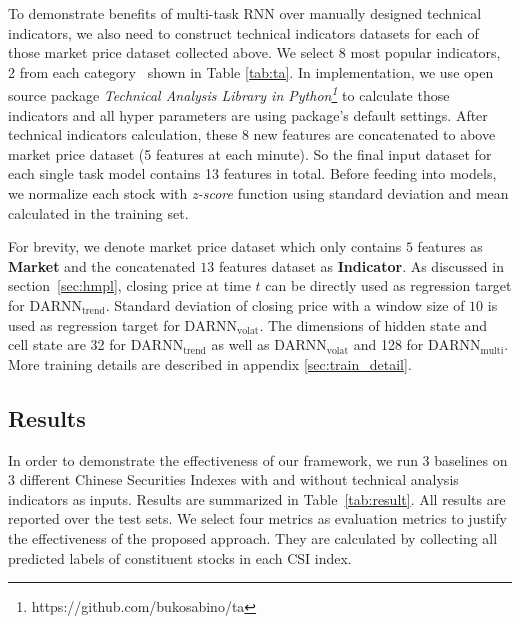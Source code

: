 \documentclass[sigconf]{acmart}
\renewcommand{\cite}{\citep}
\begin{document}
To demonstrate benefits of multi-task RNN over
manually designed technical indicators, we also need to construct
technical indicators datasets for each of those market price
dataset collected above. We select 8 most popular indicators, 2
from each category~\cite{kirkpatrick2010technical} shown in Table
\ref{tab:ta}. In implementation, we use open source package
\emph{Technical Analysis Library in
  Python\footnote{https://github.com/bukosabino/ta}} to calculate
those indicators and all hyper parameters are using package's
default settings. After technical indicators calculation, these 8
new features are concatenated to above market price dataset (5
features at each minute). So the final input dataset for each single
task model contains 13 features in total. Before feeding into
models, we normalize each stock with \emph{z-score}
function using standard deviation and mean calculated in the training set.

For brevity, we denote market price dataset which only contains  $5$ features as \textbf{Market} and the concatenated $13$ features dataset as
\textbf{Indicator}. As discussed in section~\ref{sec:hmpl}, 
closing price at time $t$ can be directly used as regression 
target for $\text{DARNN}_{\text{trend}}$. 
Standard deviation of closing price with a window size of $10$ 
is used as regression target for $\text{DARNN}_{\text{volat}}$.
The dimensions of
hidden state and cell state are 32 for $\text{DARNN}_{\text{trend}}$ as well as $\text{DARNN}_{\text{volat}}$ and
128 for $\text{DARNN}_{\text{multi}}$. More training details are
described in appendix \ref{sec:train_detail}.

\subsection{Results}
\label{sec:res}

In order to demonstrate the effectiveness of our framework, we
run 3 baselines on 3 different Chinese Securities Indexes with
and without technical analysis indicators as inputs. Results are
summarized in Table~\ref{tab:result}. All results are reported over the test sets. We select four metrics as evaluation
metrics to justify the effectiveness of the proposed approach. They are calculated by collecting all
predicted labels of constituent stocks in each CSI index.
\end{document}
